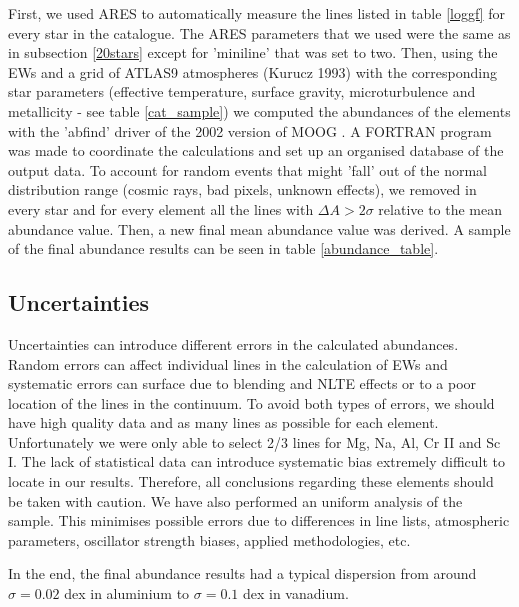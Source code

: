 \documentclass[dvips,12pt,a4paper]{report}
\begin{document}
{{First, we used ARES to automatically measure the lines listed in table \ref{loggf} for every star in the catalogue. The ARES parameters that we used were the same as in subsection \ref{20stars} except for 'miniline' that was set to two. Then, using the EWs and a grid of ATLAS9 atmospheres (Kurucz 1993) with the corresponding star parameters (effective temperature, surface gravity, microturbulence and metallicity - see table \ref{cat_sample}) we computed the abundances of the elements with the 'abfind' driver of the 2002 version of MOOG \citep{Sneden-1973}. A FORTRAN program was made to coordinate the calculations and set up an organised database of the output data. To account for random events that might 'fall' out of the normal distribution range (cosmic rays, bad pixels, unknown effects), we removed in every star and for every element all the lines with $\Delta A>2\sigma$ relative to the mean abundance value. Then, a new final mean abundance value was derived. A sample of the final abundance results can be seen in table \ref{abundance_table}. 

\subsection {Uncertainties}
\label{uncertain}
Uncertainties can introduce different errors in the calculated abundances. Random errors can affect individual lines in the calculation of EWs and systematic errors can surface due to blending and NLTE effects or to a poor location of the lines in the continuum. To avoid both types of errors, we should have high quality data and as many lines as possible for each element. Unfortunately we were only able to select 2/3 lines for Mg, Na, Al, Cr II and Sc I. The lack of statistical data can introduce systematic bias extremely difficult to locate in our results. Therefore, all conclusions regarding these elements should be taken with caution. We have also performed an uniform analysis of the sample. This minimises possible errors due to differences in line lists, atmospheric parameters, oscillator strength biases, applied methodologies, etc. 

In the end, the final abundance results had a typical dispersion from around $\sigma=0.02$ dex in aluminium to $\sigma=0.1$ dex in vanadium.

}}
\end{document}
